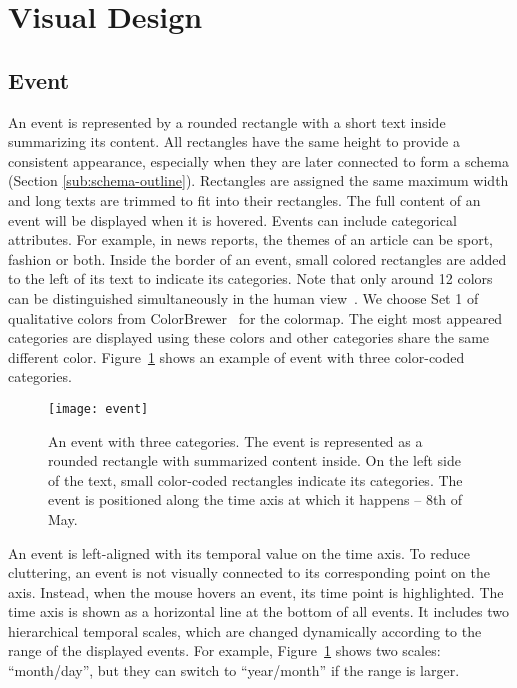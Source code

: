 \section{Visual Design}
\label{sec:interface}

\subsection{Event}
An event is represented by a rounded rectangle with a short text inside summarizing its content. All rectangles have the same height to provide a consistent appearance, especially when they are later connected to form a schema (Section \ref{sub:schema-outline}). Rectangles are assigned the same maximum width and long texts are trimmed to fit into their rectangles. The full content of an event will be displayed when it is hovered. Events can include categorical attributes. For example, in news reports, the themes of an article can be sport, fashion or both. Inside the border of an event, small colored rectangles are added to the left of its text to indicate its categories. Note that only around 12 colors can be distinguished simultaneously in the human view~\cite{Munzner2014}. We choose Set 1 of qualitative colors from ColorBrewer~\cite{Harrower2003} for the colormap. The eight most appeared categories are displayed using these colors and other categories share the same different color. Figure~\ref{fig:event} shows an example of event with three color-coded categories.

\begin{figure}[!htb]
\centering
\texttt{[image: event]}
\caption{An event with three categories. The event is represented as a rounded rectangle with summarized content inside. On the left side of the text, small color-coded rectangles indicate its categories. The event is positioned along the time axis at which it happens -- 8th of May.}
\label{fig:event}
\end{figure}

An event is left-aligned with its temporal value on the time axis. To reduce cluttering, an event is not visually connected to its corresponding point on the axis. Instead, when the mouse hovers an event, its time point is highlighted. The time axis is shown as a horizontal line at the bottom of all events. It includes two hierarchical temporal scales, which are changed dynamically according to the range of the displayed events. For example, Figure~\ref{fig:event} shows two scales: ``month/day'', but they can switch to ``year/month'' if the range is larger.

